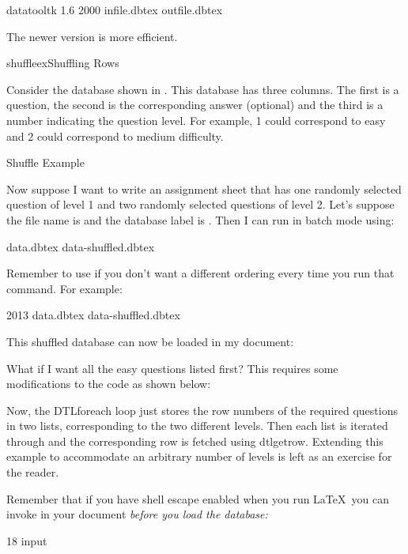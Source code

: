 \begin{terminal}
datatooltk  1.6  2000  infile.dbtex  outfile.dbtex
\end{terminal}
The newer version is more efficient.
\begin{example}{shuffleex}{Shuffling Rows}

Consider the database shown in . This database
has three columns. The first is a question, the second is the 
corresponding answer (optional) and the third is a number indicating 
the question level.  For example, 1 could correspond to easy and 2 could 
correspond to medium difficulty.

 {%
 }
 {Shuffle Example}

Now suppose I want to write an assignment sheet that has one randomly
selected question of level 1 and two randomly selected questions of
level 2. Let's suppose the file name is 
and the database label is . Then I can run 
in batch mode using:
\begin{terminal}
   data.dbtex  data-shuffled.dbtex
\end{terminal}
Remember to use  if you don't want a different
ordering every time you run that command. For example:
\begin{terminal}
  2013   data.dbtex  data-shuffled.dbtex
\end{terminal}
This shuffled database can now be loaded in my document:

What if I want all the easy questions listed first? This requires 
some modifications to the code as shown below:


Now, the \gls{DTLforeach} loop just stores the row numbers of the
required questions in two lists, corresponding to the two different levels.
Then each list is iterated through and the corresponding row is fetched
using \gls{dtlgetrow}. Extending this example to accommodate an
arbitrary number of levels is left as an exercise for the reader.

Remember that if you have shell escape enabled when you run \LaTeX\ you
can invoke  in your document \em{before} you load the database:
\begin{codebox}
18
\codepar
\gls{input}
\end{codebox}
\end{example}

